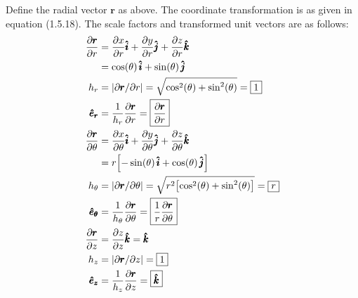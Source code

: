 \documentclass[a4paper]{article}
\begin{document}
\vspace{12pt}


Define the radial vector \( \pmb{r} \) as above. The coordinate transformation is as given in equation (1.5.18). The scale factors and transformed unit vectors are as follows:
\begin{align*}
	\frac{\partial \pmb{r}}{\partial r} & = \frac{\partial x}{\partial r}\pmb{\hat{i}} + \frac{\partial y}{\partial r}\pmb{\hat{j}} + \frac{\partial z}{\partial r}\pmb{\hat{k}} \\
	 & = \cos\!\left(\theta\right) \pmb{\hat{i}} + \sin\!\left(\theta\right) \pmb{\hat{j}} \\ 
	h_{r} & = \abs{\partial \pmb{r} / \partial r} = \sqrt{\cos^{2}\!\left(\theta\right) + \sin^{2}\!\left(\theta\right)} = \boxed{1} \\
	\pmb{\hat{e}_{r}} & = \frac{1}{h_{r}}\frac{\partial \pmb{r}}{\partial r} = \boxed{\frac{\partial \pmb{r}}{\partial r}} \\
	\frac{\partial \pmb{r}}{\partial \theta} & = \frac{\partial x}{\partial \theta}\pmb{\hat{i}} + \frac{\partial y}{\partial \theta}\pmb{\hat{j}} + \frac{\partial z}{\partial \theta}\pmb{\hat{k}} \\
						 & = r \!\left[ -\sin\!\left(\theta\right) \pmb{\hat{i}} + \cos\!\left(\theta\right) \pmb{\hat{j}} \right] \\
	h_{\theta} & = \abs{\partial \pmb{r} / \partial \theta} = \sqrt{r^{2}\!\left[ \cos^{2}\!\left(\theta\right) + \sin^{2}\!\left(\theta\right) \right]} = \boxed{r} \\
	\pmb{\hat{e}_{\theta}} & = \frac{1}{h_{\theta}}\frac{\partial \pmb{r}}{\partial \theta} = \boxed{\frac{1}{r}\frac{\partial \pmb{r}}{\partial \theta}} \\
	\frac{\partial \pmb{r}}{\partial z} & = \frac{\partial z}{\partial z}\pmb{\hat{k}} = \pmb{\hat{k}} \\
	h_{z} & = \abs{\partial \pmb{r} / \partial z} = \boxed{1} \\
	\pmb{\hat{e}_{z}} & = \frac{1}{h_{z}}\frac{\partial \pmb{r}}{\partial z} = \boxed{\pmb{\hat{k}}}
\end{align*}

\end{document}
